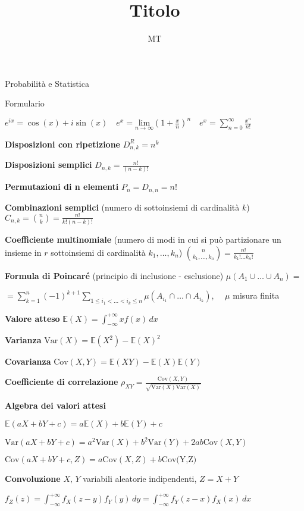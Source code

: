 \documentclass[openany]{book} %
\title{Titolo}
\date{}
\author{MT}
\begin{document}
\begin{center}
	\Large Probabilità e Statistica

	\large Formulario
\end{center}

$e^{ix} = \cos(x)+i\sin(x) \quad e^x = \underset{n \rightarrow\infty}{\text{lim}}\left(1+\frac{x}{n}\right)^n \quad e^x=\sum_{n=0}^\infty \frac{x^n}{n!}$

\textbf{Disposizioni con ripetizione} $D^R_{n,k}=n^k$

\textbf{Disposizioni semplici} $D_{n,k}=\frac{n!}{(n-k)!}$

\textbf{Permutazioni di n elementi} \quad $P_n = D_{n,n}=n!$

\textbf{Combinazioni semplici} (numero di sottoinsiemi di cardinalità $k$) \quad $C_{n,k}=\binom {n}{k} = \frac{n!}{k!(n-k)!}$

\textbf{Coefficiente multinomiale} (numero di modi in cui si può partizionare un insieme in $r$ sottoinsiemi di cardinalità $k_1,\dots,k_n$) \quad $\binom {n}{k_1,\dots,k_n}=\frac{n!}{k_1 ! \dots k_n !}$

\textbf{Formula di Poincaré} (principio di inclusione - esclusione) \quad $\mu(A_1 \cup \dots \cup A_n) =$

$= \sum_{k=1}^n (-1)^{k+1}\sum_{1\leq i_1 < \dots <i_k \leq n}\mu(A_{i_1}\cap \dots \cap A_{i_k})$, $\quad \mu$ misura finita

\textbf{Valore atteso} $\mathbb{E}(X) = \int_{-\infty}^{+\infty}xf(x)\,dx$

\textbf{Varianza} $\text{Var}(X)=\mathbb{E}(X^2)-\mathbb{E}(X)^2$

\textbf{Covarianza} $\text{Cov}(X,Y)=\mathbb{E}(XY)-\mathbb{E}(X)\mathbb{E}(Y)$

\textbf{Coefficiente di correlazione} $\rho_{XY} = \frac{\text{Cov}(X,Y)}{\sqrt {\text{Var}(X)\text{Var}(X)}}$

\textbf{Algebra dei valori attesi}

$\mathbb {E}(aX+bY+c)= a\mathbb{E}(X)+b \mathbb{E}(Y)+c$

$\text {Var}(aX+bY+c)= a^2 \text{Var}(X)+b^2 \text{Var}(Y)+2ab\text{Cov}(X,Y)$

$\text{Cov}(aX+bY+c,Z) = a \text{Cov}(X,Z)+b \text{Cov(Y,Z)}$

\textbf{Convoluzione} $X,\,Y$ variabili aleatorie indipendenti, $Z=X+Y$

$f_Z(z) = \int_{-\infty}^{+\infty}f_X(z-y)f_Y(y)\,dy = \int_{-\infty}^{+\infty}f_Y(z-x)f_X(x)\,dx$
\end{document}
